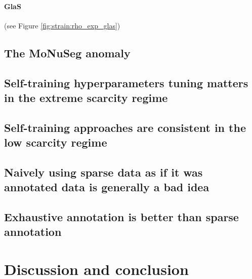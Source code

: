 \paragraph{GlaS} (see Figure \ref{fig:strain:rho_exp_glas}) 

\subsection{The MoNuSeg anomaly}



\subsection{Self-training hyperparameters tuning matters in the extreme scarcity regime}

\subsection{Self-training approaches are consistent in the low scarcity regime}

\subsection{Naively using sparse data as if it was annotated data is generally a bad idea}

\subsection{Exhaustive annotation is better than sparse annotation }



\section{Discussion and conclusion}

\parencite{haridas2015interactive, petit2018handling, petit2021iterative}